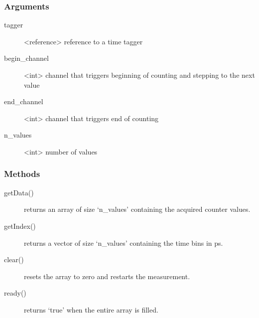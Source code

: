 \documentclass[letterpaper,10pt,english]{sphinxmanual}
\begin{document}
\subsubsection{Arguments}
\label{sections/api:id4}\begin{description}
\item[{tagger}] \leavevmode
\textless{}reference\textgreater{} reference to a time tagger

\item[{begin\_channel}] \leavevmode
\textless{}int\textgreater{} channel that triggers beginning of counting and stepping to the next value

\item[{end\_channel}] \leavevmode
\textless{}int\textgreater{} channel that triggers end of counting

\item[{n\_values}] \leavevmode
\textless{}int\textgreater{} number of values

\end{description}


\subsubsection{Methods}
\label{sections/api:id5}\begin{description}
\item[{getData()}] \leavevmode
returns an array of size `n\_values' containing the acquired counter values.

\item[{getIndex()}] \leavevmode
returns a vector of size `n\_values' containing the time bins in ps.

\item[{clear()}] \leavevmode
resets the array to zero and restarts the measurement.

\item[{ready()}] \leavevmode
returns `true' when the entire array is filled.

\end{description}
\end{document}
